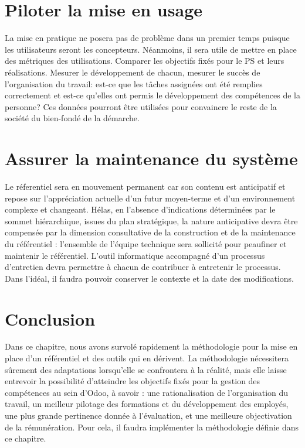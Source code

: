 \section{Piloter la mise en usage}
La mise en pratique ne posera pas de problème dans un premier temps puisque les utilisateurs seront les concepteurs. Néanmoins, il sera utile de mettre en place des métriques des utilisations. Comparer les objectifs fixés pour le PS et leurs réalisations. Mesurer le développement de chacun, mesurer le succès de l'organisation du travail: est-ce que les tâches assignées ont été remplies correctement et est-ce qu'elles ont permis le développement des compétences de la personne? Ces données pourront être utilisées pour convaincre le reste de la société du bien-fondé de la démarche. 

\section{Assurer la maintenance du système}
 Le réferentiel sera en mouvement permanent car son contenu est anticipatif et repose sur l’appréciation actuelle d’un futur moyen-terme et d’un environnement complexe et changeant. Hélas, en l'absence d'indications déterminées par le sommet hiérarchique, issues du plan stratégique, la nature anticipative devra être compensée par la dimension consultative de la construction et de la maintenance du référentiel : l’ensemble de l’équipe technique sera sollicité pour peaufiner et maintenir le référentiel. L'outil informatique accompagné d'un processus d'entretien devra permettre à chacun de contribuer à entretenir le processus. Dans l'idéal, il faudra pouvoir conserver le contexte et la date des modifications.
 
 
 \section{Conclusion}
 Dans ce chapitre, nous avons survolé rapidement la méthodologie pour la mise en place d'un référentiel et des outils qui en dérivent. La méthodologie nécessitera sûrement des adaptations lorsqu'elle se confrontera à la réalité, mais elle laisse entrevoir la possibilité d'atteindre les objectifs fixés pour la gestion des compétences au sein d'Odoo, à savoir : une rationalisation de l'organisation du travail, un meilleur pilotage des formations et du développement des employés, une plus grande pertinence donnée à l'évaluation, et une meilleure objectivation de la rémunération. Pour cela, il faudra implémenter la méthodologie définie dans ce chapitre.



